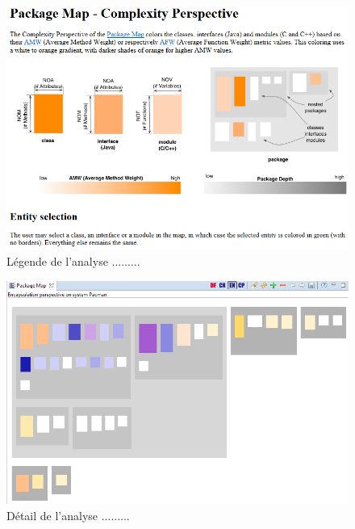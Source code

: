 \documentclass[12pt,a4paper,final]{article}
\begin{document}
\begin{figure}[ht]
	\centering
	\includegraphics[width=\textwidth]{images/InCodeComplexityLegende.png}
	\caption{\label{incodeComplLeg}Légende de l'analyse .........}
\end{figure}

\begin{figure}[ht]
	\centering
	\includegraphics[width=\textwidth]{images/InCodeEncapsulation.png}
	\caption{\label{incodeEnc}Détail de l'analyse .........}
\end{figure}
\end{document}
